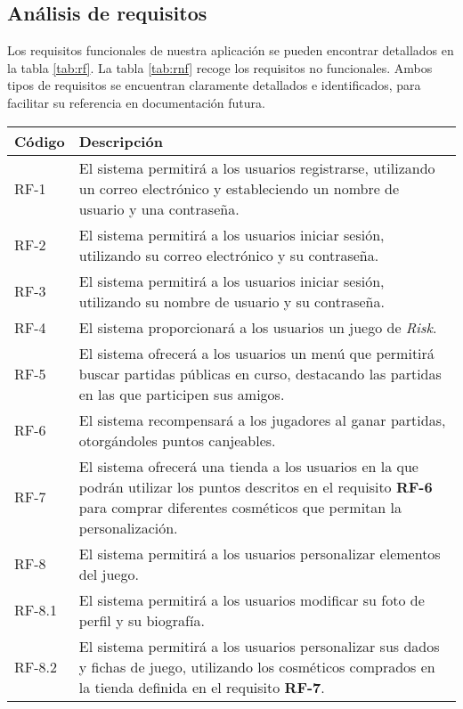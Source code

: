 \documentclass[11pt, a4paper, titlepage]{article}
\begin{document}
\subsection{Análisis de requisitos}
Los requisitos funcionales de nuestra aplicación se pueden encontrar detallados en la tabla \ref{tab:rf}. La tabla \ref{tab:rnf} recoge los requisitos no funcionales. Ambos tipos de requisitos se encuentran claramente detallados e identificados, para facilitar su referencia en documentación futura.
\renewcommand{\arraystretch}{1.3}
\begin{table}[h!]
    \centering
    \begin{tabularx}{\textwidth}{|l|X|}
    \hline
         Código & Descripción  \\
         \hline
         RF-1 & El sistema permitirá a los usuarios registrarse, utilizando un correo electrónico y estableciendo un nombre de usuario y una contraseña.\\
         \hline
         RF-2 & El sistema permitirá a los usuarios iniciar sesión, utilizando su correo electrónico y su contraseña.\\
         \hline
         RF-3 & El sistema permitirá a los usuarios iniciar sesión, utilizando su nombre de usuario y su contraseña.\\
         \hline
         RF-4 & El sistema proporcionará a los usuarios un juego de \textit{Risk}.\\
         \hline
         RF-5 & El sistema ofrecerá a los usuarios un menú que permitirá buscar partidas públicas en curso, destacando las partidas en las que participen sus amigos.\\
         \hline
         RF-6 & El sistema recompensará a los jugadores al ganar partidas, otorgándoles puntos canjeables.\\
         \hline
         RF-7 & El sistema ofrecerá una tienda a los usuarios en la que podrán utilizar los puntos descritos en el requisito \textbf{RF-6} para comprar diferentes cosméticos que permitan la personalización. \\
         \hline
         RF-8 & El sistema permitirá a los usuarios personalizar elementos del juego.\\
         \hline
         RF-8.1 & El sistema permitirá a los usuarios modificar su foto de perfil y su biografía.\\
         \hline
         RF-8.2 & El sistema permitirá a los usuarios personalizar sus dados y fichas de juego, utilizando los cosméticos comprados en la tienda definida en el requisito \textbf{RF-7}.\\

\end{tabularx}
\end{table}
\end{document}

